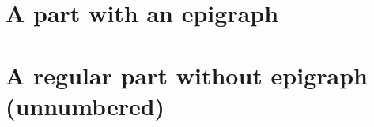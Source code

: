 \documentclass[11pt, a4paper, makeidx]{memoir}
\newcommand{\epipart}[3]{
\let\oldafterpartskip\afterpartskip
\renewcommand{\afterpartskip}{%
\vspace{1em}
\epigraph{#2}{#3}
\vfill
}
\part*{#1}
\let\afterpartskip\oldafterpartskip
}
\begin{document}

\frontmatter


\mainmatter

\pagestyle{companion}

\epipart{A part with an epigraph}{"A fancy quote"}{Some pretentious author}

\part*{A regular part without epigraph (unnumbered)}
 


{\small}

\appendix
\appendixpage*


\backmatter

\end{document}
